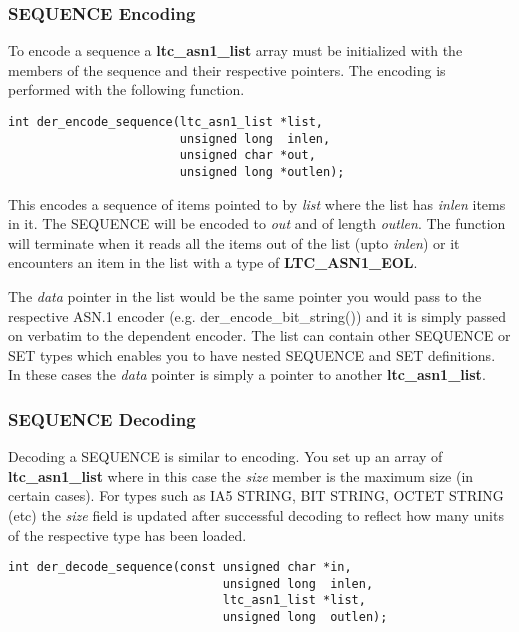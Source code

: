 \documentclass[synpaper]{book}
\begin{document}
\subsubsection{SEQUENCE Encoding}
To encode a sequence a \textbf{ltc\_asn1\_list} array must be initialized with the members of the sequence and their respective pointers.  The encoding is performed
with the following function.

\begin{verbatim}
int der_encode_sequence(ltc_asn1_list *list, 
                        unsigned long  inlen,
                        unsigned char *out,  
                        unsigned long *outlen);
\end{verbatim}
This encodes a sequence of items pointed to by \textit{list} where the list has \textit{inlen} items in it.  The SEQUENCE will be encoded to \textit{out} and of length \textit{outlen}.  The
function will terminate when it reads all the items out of the list (upto \textit{inlen}) or it encounters an item in the list with a type of \textbf{LTC\_ASN1\_EOL}.

The \textit{data} pointer in the list would be the same pointer you would pass to the respective ASN.1 encoder (e.g. der\_encode\_bit\_string()) and it is simply passed on
verbatim to the dependent encoder.  The list can contain other SEQUENCE or SET types which enables you to have nested SEQUENCE and SET definitions.  In these cases
the \textit{data} pointer is simply a pointer to another \textbf{ltc\_asn1\_list}.

\subsubsection{SEQUENCE Decoding}


Decoding a SEQUENCE is similar to encoding.  You set up an array of \textbf{ltc\_asn1\_list} where in this case the \textit{size} member is the maximum size 
(in certain cases).  For types such as IA5 STRING, BIT STRING, OCTET STRING (etc) the \textit{size} field is updated after successful decoding to reflect how many
units of the respective type has been loaded.  

\begin{verbatim}
int der_decode_sequence(const unsigned char *in,
                              unsigned long  inlen,
                              ltc_asn1_list *list, 
                              unsigned long  outlen);
\end{verbatim}
\end{document}

